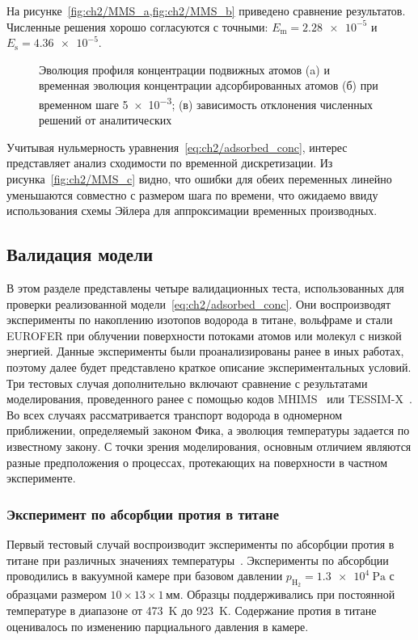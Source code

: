 На рисунке~\cref{fig:ch2/MMS_a,fig:ch2/MMS_b} приведено сравнение результатов. Численные решения хорошо согласуются с точными: \(E_\mathrm{m} = \num{2.28e-5} \) и \( E_\mathrm{s}= \num{4.36e-5} \).
\begin{figure}[ht]
    \caption{Эволюция профиля концентрации подвижных атомов (a) и временная эволюция концентрации адсорбированных атомов (б) при временном шаге \num{5e-3}; (в) зависимость отклонения численных решений от аналитических}\label{fig:ch2/MMS}
\end{figure}
Учитывая нульмерность уравнения~\cref{eq:ch2/adsorbed_conc}, интерес представляет анализ сходимости по временной дискретизации. Из рисунка~\cref{fig:ch2/MMS_c} видно, что ошибки для обеих переменных линейно уменьшаются совместно с размером шага по времени, что ожидаемо ввиду использования схемы Эйлера для аппроксимации временных производных.

\subsection{Валидация модели}\label{sec:ch2/sec3/subsec2}

В этом разделе представлены четыре валидационных теста, использованных для проверки реализованной модели~\cref{eq:ch2/adsorbed_conc}. Они воспроизводят эксперименты по накоплению изотопов водорода в титане, вольфраме и стали EUROFER при облучении поверхности потоками атомов или молекул с низкой энергией. Данные эксперименты были проанализированы ранее в иных работах, поэтому далее будет представлено краткое описание экспериментальных условий. Три тестовых случая дополнительно включают сравнение с результатами моделирования, проведенного ранее с помощью кодов MHIMS~\cite{Hodille2024} или TESSIM-X~\cite{Schmid2023_2}. Во всех случаях рассматривается транспорт водорода в одномерном приближении, определяемый законом Фика, а эволюция температуры задается по известному закону. С точки зрения моделирования, основным отличием являются разные предположения о процессах, протекающих на поверхности в частном эксперименте.

\subsubsection{Эксперимент по абсорбции протия в титане}
Первый тестовый случай воспроизводит эксперименты по абсорбции протия в титане при различных значениях температуры~\cite{Hirooka1981}. Эксперименты по абсорбции проводились в вакуумной камере при базовом давлении $p_\mathrm{H_2}=\SI{1.3e4}{\pascal}$ с образцами размером $10\times13\times1$\,мм. Образцы поддерживались при постоянной температуре в диапазоне от \SI{473}{K} до \SI{923}{K}. Содержание протия в титане оценивалось по изменению парциального давления в камере.

